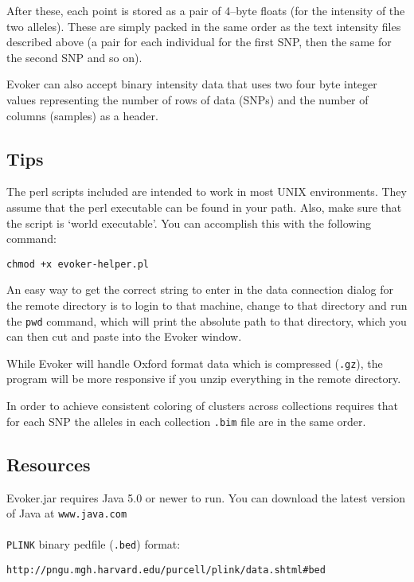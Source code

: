 \documentclass{article}
\begin{document}
\noindent After these, each point is stored as a pair of 4--byte floats (for the intensity of the two alleles). These are simply packed in the same order as the text intensity files described above (a pair for each individual for the first SNP, then the same for the second SNP and so on).

Evoker can also accept binary intensity data that uses two four byte integer values representing the number of rows of data (SNPs) and the number of columns (samples) as a header.

\subsection{Tips}

The perl scripts included are intended to work in most UNIX environments. They assume that the perl executable can be found in your path.  Also, make sure that the script is `world executable'. You can accomplish this with the following command: 

\begin{verbatim}
chmod +x evoker-helper.pl
\end{verbatim}

\noindent An easy way to get the correct string to enter in the data connection dialog for the remote directory is to login to that machine, change to that directory and run the \texttt{pwd} command, which will print the absolute path to that directory, which you can then cut and paste into the Evoker window.

\noindent While Evoker will handle Oxford format data which is compressed (\texttt{.gz}), the program will be more responsive if you unzip everything in the remote directory.

\noindent In order to achieve consistent coloring of clusters across collections requires that for each SNP the alleles in each collection \texttt{.bim} file are in the same order.

\subsection{Resources}
Evoker.jar requires Java 5.0 or newer to run. You can download the latest version of Java at \texttt{www.java.com}
\\
\\
\texttt{PLINK} binary pedfile (\texttt{.bed}) format:  

\indent \texttt{http://pngu.mgh.harvard.edu/purcell/plink/data.shtml\#bed}
\end{document}
